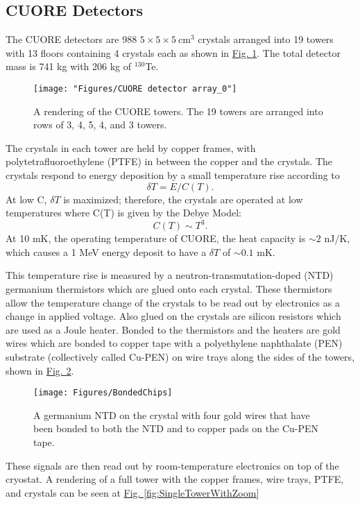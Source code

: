 \documentclass[12pt,a4paper]{article}
\begin{document}
\subsection{CUORE Detectors}

The CUORE detectors are 988 $ 5\times 5 \times 5~ \textrm{cm}^3$ crystals arranged into 19 towers with 13 floors containing 4 crystals each as shown in \hyperref[fig:cuore-detector-array0]{Fig. \ref*{fig:cuore-detector-array0}}. The total detector mass is 741 kg with 206 kg of $^{130}$Te. 

\begin{figure}[htbp]
\centering
\texttt{[image: "Figures/CUORE detector array\_0"]}
\caption{A rendering of the CUORE towers. The 19 towers are arranged into rows of 3, 4, 5, 4, and 3 towers.}
\label{fig:cuore-detector-array0}
\end{figure}


The crystals in each tower are held by copper frames, with polytetrafluoroethylene (PTFE) in between the copper and the crystals. The crystals respond to energy deposition by a small temperature rise according to
\begin{equation}
\delta T = E/C(T).
\end{equation}
At low C, $\delta T$ is maximized; therefore, the crystals are operated at low temperatures where C(T) is given by the Debye Model:
\begin{equation}
C(T)\sim T^3.
\end{equation}
At 10 mK, the operating temperature of CUORE, the heat capacity is $\sim2$ nJ/K, which causes a 1 MeV energy deposit to have a $\delta T$ of $\sim0.1$ mK.

This temperature rise is measured by a neutron-transmutation-doped (NTD) germanium thermistors which are glued onto each crystal. These thermistors allow the temperature change of the crystals to be read out by electronics as a change in applied voltage. Also glued on the crystals are silicon resistors which are used as a Joule heater. Bonded to the thermistors and the heaters are gold wires which are bonded to copper tape with a polyethylene naphthalate (PEN) substrate (collectively called Cu-PEN) on wire trays along the sides of the towers, shown in \hyperref[fig:bondedchips]{Fig. \ref*{fig:bondedchips}}.
\begin{figure}[htbp]
\centering
\texttt{[image: Figures/BondedChips]}
\caption{A germanium NTD on the crystal with four gold wires that have been bonded to both the NTD and to copper pads on the Cu-PEN tape.}
\label{fig:bondedchips}
\end{figure}
These signals are then read out by room-temperature electronics on top of the cryostat. A rendering of a full tower with the copper frames, wire trays, PTFE, and crystals can be seen at \hyperref[fig:SingleTowerWithZoom]{Fig. \ref*{fig:SingleTowerWithZoom}}
\end{document}
